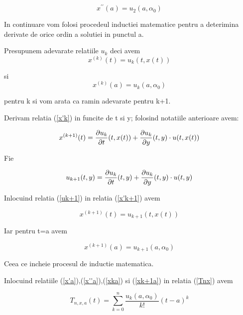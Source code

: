 \documentclass[a4paper,twoside]{book}
\begin{document}
\begin{equation}
x^{\prime \prime }(a)=u_{2}(a,\alpha _{0})  \label{x''a}
\end{equation}

In continuare vom folosi procedeul inductiei matematice pentru a deterimina
derivate de orice ordin a solutiei in punctul a.

Presupunem adevarate relatiile $u_{k}$ deci avem 
\begin{equation}
x^{(k)}(t)=u_{k}(t,x(t))  \label{x'k}
\end{equation}

si%
\begin{equation}
x^{(k)}(a)=u_{k}(a,\alpha _{0})  \label{xka}
\end{equation}

pentru k si vom arata ca ramin adevarate pentru k+1.

Derivam relatia (\ref{x'k}) in funcite de t si y; folosind notatiile
anterioare avem:

\begin{equation}
x^{(k+1)}(t)=\frac{\partial u_{k}}{\partial t}(t,x(t))+\frac{\partial u_{k}}{%
\partial y}(t,y)\cdot u(t,x(t))  \label{x'k+1}
\end{equation}

Fie

\begin{equation}
u_{k+1}(t,y)=\frac{\partial u_{k}}{\partial t}(t,y)+\frac{\partial u_{k}}{%
\partial y}(t,y)\cdot u(t,y)  \label{uk+1}
\end{equation}

Inlocuind relatia (\ref{uk+1}) in relatia (\ref{x'k+1}) avem

\begin{equation*}
x^{(k+1)}(t)=u_{k+1}(t,x(t))
\end{equation*}

Iar pentru t=a avem

\begin{equation}
x^{(k+1)}(a)=u_{k+1}(a,\alpha _{0})  \label{xk+1a}
\end{equation}

Ceea ce incheie procesul de inductie matematica.

Inlocuind relatiile (\ref{x'a}),(\ref{x''a}),(\ref{xka}) si (\ref{xk+1a}) in
relatia (\ref{Tnx}) avem

\begin{equation}
T_{n,x,a}(t)=\sum_{k=0}^{n}\frac{u_{k}(a,\alpha _{0})}{k!}(t-a)^{k}
\label{Tnx1}
\end{equation}
\end{document}
